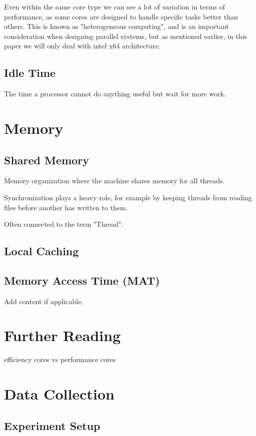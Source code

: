 \documentclass[12pt,a4paper]{article}
\begin{document}
Even within the same core type we can see a lot of variation in terms of performance, as some cores are designed to handle specific tasks better than others. This is known as "heterogeneous computing", and is an important consideration when designing parallel systems, but as mentioned earlier, in this paper we will only deal with intel x64 architecture.

\subsection{Idle Time}

The time a processor cannot do anything useful but wait for more work.

\section{Memory}

\subsection{Shared Memory}

Memory organization where the machine shares memory for all threads.

Synchronization plays a heavy role, for example by keeping threads from reading files before another has written to them.

Often connected to the term "Thread".

\subsection{Local Caching}

\subsection{Memory Access Time (MAT)}

Add content if applicable.

\section{Further Reading}

efficiency cores vs performance cores

\section{Data Collection}

\subsection{Experiment Setup}
\end{document}
